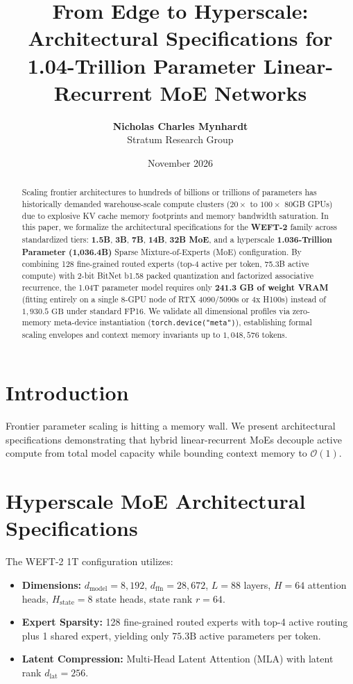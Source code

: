 \documentclass[11pt,a4paper]{article}
\title{\textbf{From Edge to Hyperscale: Architectural Specifications for 1.04-Trillion Parameter Linear-Recurrent MoE Networks}}
\author{
  \textbf{Nicholas Charles Mynhardt} \\
  Stratum Research Group
}
\date{November 2026}
\begin{document}
\maketitle

\begin{abstract}
Scaling frontier architectures to hundreds of billions or trillions of parameters has historically demanded warehouse-scale compute clusters ($20\times$ to $100\times$ 80GB GPUs) due to explosive KV cache memory footprints and memory bandwidth saturation. In this paper, we formalize the architectural specifications for the \textbf{WEFT-2} family across standardized tiers: \textbf{1.5B}, \textbf{3B}, \textbf{7B}, \textbf{14B}, \textbf{32B MoE}, and a hyperscale \textbf{1.036-Trillion Parameter (1,036.4B)} Sparse Mixture-of-Experts (MoE) configuration. By combining 128 fine-grained routed experts (top-4 active per token, 75.3B active compute) with 2-bit BitNet b1.58 packed quantization and factorized associative recurrence, the 1.04T parameter model requires only \textbf{241.3 GB of weight VRAM} (fitting entirely on a single 8-GPU node of RTX 4090/5090s or 4x H100s) instead of $1,930.5\text{ GB}$ under standard FP16. We validate all dimensional profiles via zero-memory meta-device instantiation (\texttt{torch.device("meta")}), establishing formal scaling envelopes and context memory invariants up to $1,048,576$ tokens.
\end{abstract}

\section{Introduction}
Frontier parameter scaling is hitting a memory wall. We present architectural specifications demonstrating that hybrid linear-recurrent MoEs decouple active compute from total model capacity while bounding context memory to $\mathcal{O}(1)$.

\section{Hyperscale MoE Architectural Specifications}
The WEFT-2 1T configuration utilizes:
\begin{itemize}
    \item \textbf{Dimensions:} $d_{\text{model}} = 8,192$, $d_{\text{ffn}} = 28,672$, $L = 88$ layers, $H = 64$ attention heads, $H_{\text{state}} = 8$ state heads, state rank $r = 64$.
    \item \textbf{Expert Sparsity:} 128 fine-grained routed experts with top-4 active routing plus 1 shared expert, yielding only $75.3\text{B}$ active parameters per token.
    \item \textbf{Latent Compression:} Multi-Head Latent Attention (MLA) with latent rank $d_{\text{lat}} = 256$.
\end{itemize}
\end{document}
